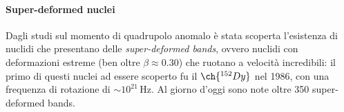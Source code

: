 \paragraph{Super-deformed nuclei}

Dagli studi sul momento di quadrupolo anomalo è stata scoperta l'esistenza di nuclidi che presentano delle \textit{super-deformed bands}, ovvero nuclidi con deformazioni estreme (ben oltre $ \beta \approx 0.30 $) che ruotano a velocità incredibili: il primo di questi nuclei ad essere scoperto fu il $ \ch{^{152}Dy} $ nel 1986, con una frequenza di rotazione di $ \sim 10^{21} \,\text{Hz} $. Al giorno d'oggi sono note oltre 350 super-deformed bands.










